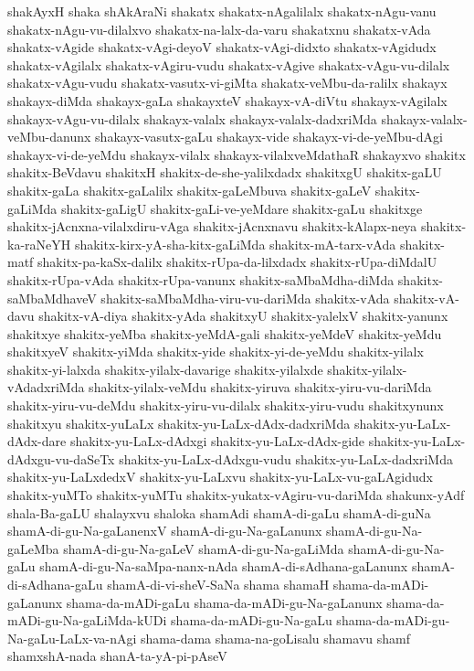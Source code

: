 {shakAyxH
shaka
shAkAraNi
shakatx
shakatx-nAgalilalx
shakatx-nAgu-vanu
shakatx-nAgu-vu-dilalxvo
shakatx-na-lalx-da-varu
shakatxnu
shakatx-vAda
shakatx-vAgide
shakatx-vAgi-deyoV
shakatx-vAgi-didxto
shakatx-vAgidudx
shakatx-vAgilalx
shakatx-vAgiru-vudu
shakatx-vAgive
shakatx-vAgu-vu-dilalx
shakatx-vAgu-vudu
shakatx-vasutx-vi-giMta
shakatx-veMbu-da-ralilx
shakayx
shakayx-diMda
shakayx-gaLa
shakayxteV
shakayx-vA-diVtu
shakayx-vAgilalx
shakayx-vAgu-vu-dilalx
shakayx-valalx
shakayx-valalx-dadxriMda
shakayx-valalx-veMbu-danunx
shakayx-vasutx-gaLu
shakayx-vide
shakayx-vi-de-yeMbu-dAgi
shakayx-vi-de-yeMdu
shakayx-vilalx
shakayx-vilalxveMdathaR
shakayxvo
shakitx
shakitx-BeVdavu
shakitxH
shakitx-de-she-yalilxdadx
shakitxgU
shakitx-gaLU
shakitx-gaLa
shakitx-gaLalilx
shakitx-gaLeMbuva
shakitx-gaLeV
shakitx-gaLiMda
shakitx-gaLigU
shakitx-gaLi-ve-yeMdare
shakitx-gaLu
shakitxge
shakitx-jAcnxna-vilalxdiru-vAga
shakitx-jAcnxnavu
shakitx-kAlapx-neya
shakitx-ka-raNeYH
shakitx-kirx-yA-sha-kitx-gaLiMda
shakitx-mA-tarx-vAda
shakitx-matf
shakitx-pa-kaSx-dalilx
shakitx-rUpa-da-lilxdadx
shakitx-rUpa-diMdalU
shakitx-rUpa-vAda
shakitx-rUpa-vanunx
shakitx-saMbaMdha-diMda
shakitx-saMbaMdhaveV
shakitx-saMbaMdha-viru-vu-dariMda
shakitx-vAda
shakitx-vA-davu
shakitx-vA-diya
shakitx-yAda
shakitxyU
shakitx-yalelxV
shakitx-yanunx
shakitxye
shakitx-yeMba
shakitx-yeMdA-gali
shakitx-yeMdeV
shakitx-yeMdu
shakitxyeV
shakitx-yiMda
shakitx-yide
shakitx-yi-de-yeMdu
shakitx-yilalx
shakitx-yi-lalxda
shakitx-yilalx-davarige
shakitx-yilalxde
shakitx-yilalx-vAdadxriMda
shakitx-yilalx-veMdu
shakitx-yiruva
shakitx-yiru-vu-dariMda
shakitx-yiru-vu-deMdu
shakitx-yiru-vu-dilalx
shakitx-yiru-vudu
shakitxynunx
shakitxyu
shakitx-yuLaLx
shakitx-yu-LaLx-dAdx-dadxriMda
shakitx-yu-LaLx-dAdx-dare
shakitx-yu-LaLx-dAdxgi
shakitx-yu-LaLx-dAdx-gide
shakitx-yu-LaLx-dAdxgu-vu-daSeTx
shakitx-yu-LaLx-dAdxgu-vudu
shakitx-yu-LaLx-dadxriMda
shakitx-yu-LaLxdedxV
shakitx-yu-LaLxvu
shakitx-yu-LaLx-vu-gaLAgidudx
shakitx-yuMTo
shakitx-yuMTu
shakitx-yukatx-vAgiru-vu-dariMda
shakunx-yAdf
shala-Ba-gaLU
shalayxvu
shaloka
shamAdi
shamA-di-gaLu
shamA-di-guNa
shamA-di-gu-Na-gaLanenxV
shamA-di-gu-Na-gaLanunx
shamA-di-gu-Na-gaLeMba
shamA-di-gu-Na-gaLeV
shamA-di-gu-Na-gaLiMda
shamA-di-gu-Na-gaLu
shamA-di-gu-Na-saMpa-nanx-nAda
shamA-di-sAdhana-gaLanunx
shamA-di-sAdhana-gaLu
shamA-di-vi-sheV-SaNa
shama
shamaH
shama-da-mADi-gaLanunx
shama-da-mADi-gaLu
shama-da-mADi-gu-Na-gaLanunx
shama-da-mADi-gu-Na-gaLiMda-kUDi
shama-da-mADi-gu-Na-gaLu
shama-da-mADi-gu-Na-gaLu-LaLx-va-nAgi
shama-dama
shama-na-goLisalu
shamavu
shamf
shamxshA-nada
shanA-ta-yA-pi-pAseV
}
